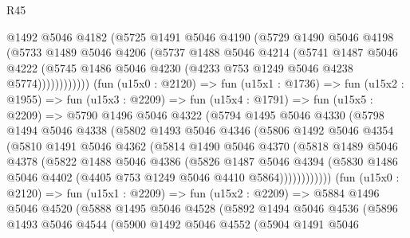 \begin{lexlean}{R45}
\begin{coremodule}
                  @1492
                  @5046
                  @4182
                  (@5725
                    @1491
                    @5046
                    @4190
                    (@5729
                      @1490
                      @5046
                      @4198
                      (@5733
                        @1489
                        @5046
                        @4206
                        (@5737
                          @1488
                          @5046
                          @4214
                          (@5741
                            @1487
                            @5046
                            @4222
                            (@5745 @1486 @5046 @4230 (@4233 @753 @1249 @5046 @4238 @5774))))))))))))
        (fun (u15x0 : @2120) =>
        fun (u15x1 : @1736) =>
        fun (u15x2 : @1955) =>
        fun (u15x3 : @2209) =>
        fun (u15x4 : @1791) =>
        fun (u15x5 : @2209) =>
        @5790
          @1496
          @5046
          @4322
          (@5794
            @1495
            @5046
            @4330
            (@5798
              @1494
              @5046
              @4338
              (@5802
                @1493
                @5046
                @4346
                (@5806
                  @1492
                  @5046
                  @4354
                  (@5810
                    @1491
                    @5046
                    @4362
                    (@5814
                      @1490
                      @5046
                      @4370
                      (@5818
                        @1489
                        @5046
                        @4378
                        (@5822
                          @1488
                          @5046
                          @4386
                          (@5826
                            @1487
                            @5046
                            @4394
                            (@5830 @1486 @5046 @4402 (@4405 @753 @1249 @5046 @4410 @5864))))))))))))
        (fun (u15x0 : @2120) =>
        fun (u15x1 : @2209) =>
        fun (u15x2 : @2209) =>
        @5884
          @1496
          @5046
          @4520
          (@5888
            @1495
            @5046
            @4528
            (@5892
              @1494
              @5046
              @4536
              (@5896
                @1493
                @5046
                @4544
                (@5900
                  @1492
                  @5046
                  @4552
                  (@5904
                    @1491
                    @5046

\end{coremodule}
\end{lexlean}
